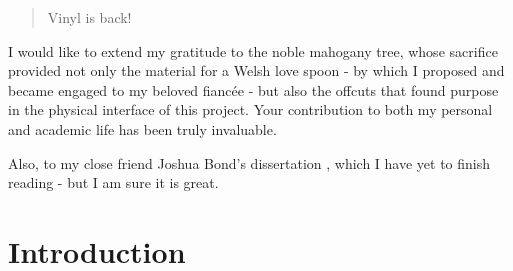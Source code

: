     \begin{abstract} %
      Vinyl is back!
    
    \end{abstract}%
    \clearpage
    
    
    
    \uomdeclarations %
    
    
    
    \begin{uomacknowledgements}
    I would like to extend my gratitude to the noble mahogany tree, whose sacrifice provided not only the material for a Welsh love spoon - by which I proposed and became engaged to my beloved fiancée - but also the offcuts that found purpose in the physical interface of this project. Your contribution to both my personal and academic life has been truly invaluable.
    
    Also, to my close friend Joshua Bond’s dissertation \cite{jdbond}, which I have yet to finish reading - but I am sure it is great.
    \end{uomacknowledgements}
    
    
    
    \section{Introduction}
    
    
    

